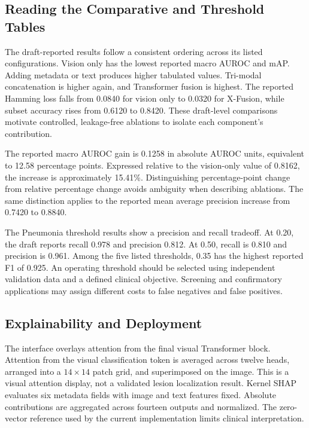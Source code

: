 \documentclass[conference,letterpaper]{IEEEtran}
\begin{document}
\subsection{Reading the Comparative and Threshold Tables}

The draft-reported results follow a consistent ordering across its listed configurations. Vision only has the lowest reported macro AUROC and mAP. Adding metadata or text produces higher tabulated values. Tri-modal concatenation is higher again, and Transformer fusion is highest. The reported Hamming loss falls from 0.0840 for vision only to 0.0320 for X-Fusion, while subset accuracy rises from 0.6120 to 0.8420. These draft-level comparisons motivate controlled, leakage-free ablations to isolate each component's contribution.

The reported macro AUROC gain is 0.1258 in absolute AUROC units, equivalent to 12.58 percentage points. Expressed relative to the vision-only value of 0.8162, the increase is approximately 15.41\%. Distinguishing percentage-point change from relative percentage change avoids ambiguity when describing ablations. The same distinction applies to the reported mean average precision increase from 0.7420 to 0.8840.

The Pneumonia threshold results show a precision and recall tradeoff. At 0.20, the draft reports recall 0.978 and precision 0.812. At 0.50, recall is 0.810 and precision is 0.961. Among the five listed thresholds, 0.35 has the highest reported F1 of 0.925. An operating threshold should be selected using independent validation data and a defined clinical objective. Screening and confirmatory applications may assign different costs to false negatives and false positives.

\subsection{Explainability and Deployment}

The interface overlays attention from the final visual Transformer block. Attention from the visual classification token is averaged across twelve heads, arranged into a $14\times14$ patch grid, and superimposed on the image. This is a visual attention display, not a validated lesion localization result. Kernel SHAP evaluates six metadata fields with image and text features fixed. Absolute contributions are aggregated across fourteen outputs and normalized. The zero-vector reference used by the current implementation limits clinical interpretation.
\end{document}
